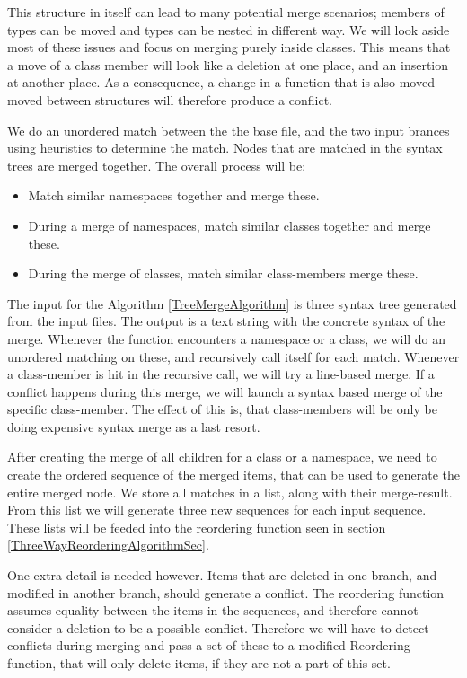 \documentclass[11pt]{article}
\begin{document}
This structure in itself can lead to many potential merge scenarios; members of types can be moved and types can be nested in different way. We will look aside most of these issues and focus on merging purely inside classes. This means that a move of a class member will look like a deletion at one place, and an insertion at another place. As a consequence, a change in a function that is also moved moved between structures will therefore produce a conflict.

We do an unordered match between the the base file, and the two input brances using heuristics to determine the match. Nodes that are matched in the syntax trees are merged together. The overall process will be:

\begin{itemize}
   \item Match similar namespaces together and merge these.
   \item During a merge of namespaces, match similar classes together and merge these.
   \item During the merge of classes, match similar class-members merge these.
\end{itemize}

The input for the Algorithm \ref{TreeMergeAlgorithm} is three syntax tree generated from the input files. The output is a text string with the concrete syntax of the merge. Whenever the function encounters a namespace or a class, we will do an unordered matching on these, and recursively call itself for each match. Whenever a class-member is hit in the recursive call, we will try a line-based merge. If a conflict happens during this merge, we will launch a syntax based merge of the specific class-member. The effect of this is, that class-members will be only be doing expensive syntax merge as a last resort.

After creating the merge of all children for a class or a namespace, we need to create the ordered sequence of the merged items, that can be used to generate the entire merged node. We store all matches in a list, along with their merge-result. From this list we will generate three new sequences for each input sequence. These lists will be feeded into the reordering function seen in section \ref{ThreeWayReorderingAlgorithmSec}.

One extra detail is needed however. Items that are deleted in one branch, and modified in another branch, should generate a conflict. The reordering function assumes equality between the items in the sequences, and therefore cannot consider a deletion to be a possible conflict. Therefore we will have to detect conflicts during merging and pass a set of these to a modified Reordering function, that will only delete items, if they are not a part of this set.
\end{document}
